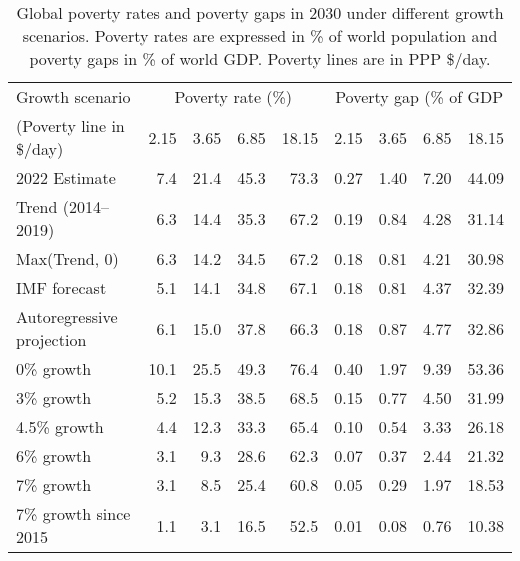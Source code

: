 \begin{table}[h]

\caption{\label{tab:poverty_full}Global poverty rates and poverty gaps in 2030 under different growth scenarios. Poverty rates are expressed in \% of world population and poverty gaps in \% of world GDP. Poverty lines are in PPP \$/day.}
\centering
\begin{tabular}[t]{lrrrrrrrr}
\toprule Growth scenario & \multicolumn{4}{c}{Poverty rate (\%)} & \multicolumn{4}{c}{Poverty gap (\% of GDP} \\ 
 (Poverty line in \$/day)  & 2.15 & 3.65 & 6.85 & 18.15 & 2.15 & 3.65 & 6.85 & 18.15\\
\midrule
2022 Estimate & 7.4 & 21.4 & 45.3 & 73.3 & 0.27 & 1.40 & 7.20 & 44.09\\
Trend (2014--2019) & 6.3 & 14.4 & 35.3 & 67.2 & 0.19 & 0.84 & 4.28 & 31.14\\
Max(Trend, 0) & 6.3 & 14.2 & 34.5 & 67.2 & 0.18 & 0.81 & 4.21 & 30.98\\
IMF forecast & 5.1 & 14.1 & 34.8 & 67.1 & 0.18 & 0.81 & 4.37 & 32.39\\
Autoregressive projection & 6.1 & 15.0 & 37.8 & 66.3 & 0.18 & 0.87 & 4.77 & 32.86\\
0\% growth & 10.1 & 25.5 & 49.3 & 76.4 & 0.40 & 1.97 & 9.39 & 53.36\\
3\% growth & 5.2 & 15.3 & 38.5 & 68.5 & 0.15 & 0.77 & 4.50 & 31.99\\
4.5\% growth & 4.4 & 12.3 & 33.3 & 65.4 & 0.10 & 0.54 & 3.33 & 26.18\\
6\% growth & 3.1 & 9.3 & 28.6 & 62.3 & 0.07 & 0.37 & 2.44 & 21.32\\
7\% growth & 3.1 & 8.5 & 25.4 & 60.8 & 0.05 & 0.29 & 1.97 & 18.53\\
7\% growth since 2015 & 1.1 & 3.1 & 16.5 & 52.5 & 0.01 & 0.08 & 0.76 & 10.38\\
\bottomrule
\end{tabular}
\end{table}
